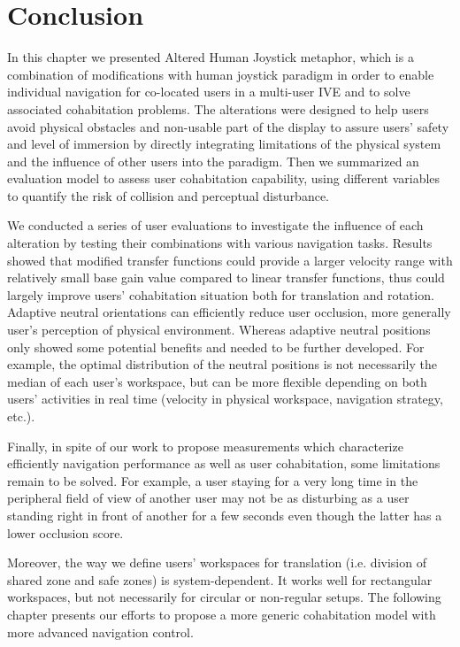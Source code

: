 

\section{Conclusion}
In this chapter we presented Altered Human Joystick metaphor, which is a combination of modifications with human joystick paradigm in order to enable individual navigation for co-located users in a multi-user IVE and to solve associated cohabitation problems. The alterations were designed to help users avoid physical obstacles and non-usable part of the display to assure users' safety and level of immersion by directly integrating limitations of the physical system and the influence of other users into the paradigm. Then we summarized an evaluation model to assess user cohabitation capability, using different variables to quantify the risk of collision and perceptual disturbance.

We conducted a series of user evaluations to investigate the influence of each alteration by testing their combinations with various navigation tasks. Results showed that modified transfer functions could provide a larger velocity range with relatively small base gain value compared to linear transfer functions, thus could largely improve users' cohabitation situation both for translation and rotation. Adaptive neutral orientations can efficiently reduce user occlusion, more generally user's perception of physical environment. Whereas adaptive neutral positions only showed some potential benefits and needed to be further developed. For example, the optimal distribution of the neutral positions is not necessarily the median of each user's workspace, but can be more flexible depending on both users' activities in real time (velocity in physical workspace, navigation strategy, etc.).

Finally, in spite of our work to propose measurements which characterize efficiently navigation performance as well as user cohabitation, some limitations remain to be solved. For example, a user staying for a very long time in the peripheral field of view of another user may not be as disturbing as a user standing right in front of another for a few seconds even though the latter has a lower occlusion score.

Moreover, the way we define users' workspaces for translation (i.e. division of shared zone and safe zones) is system-dependent. It works well for rectangular workspaces, but not necessarily for circular or non-regular setups. The following chapter presents our efforts to propose a more generic cohabitation model with more advanced navigation control. 
